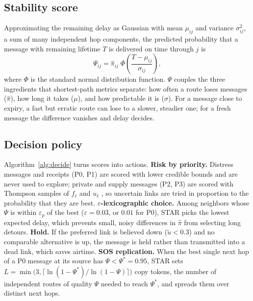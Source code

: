 \documentclass[jou,a4paper,11pt,floatsintext]{apa7}
\begin{document}
\subsection{Stability score}

Approximating the remaining delay as Gaussian with mean $\mu_{ij}$ and variance $\sigma^2_{ij}$, a sum of many independent hop components, the predicted probability that a message with remaining lifetime $T$ is delivered on time through $j$ is
\begin{equation}
\Psi_{ij}=\hat\pi_{ij}\;\Phi\!\left(\frac{T-\mu_{ij}}{\sigma_{ij}}\right),
\label{eq:psi}
\end{equation}
where $\Phi$ is the standard normal distribution function. $\Psi$ couples the three ingredients that shortest-path metrics separate: how often a route loses messages ($\hat\pi$), how long it takes ($\mu$), and how predictable it is ($\sigma$). For a message close to expiry, a fast but erratic route can lose to a slower, steadier one; for a fresh message the difference vanishes and delay decides.

\subsection{Decision policy}



Algorithm~\ref{alg:decide} turns scores into actions. \textbf{Risk by priority.} Distress messages and receipts (P0, P1) are scored with lower credible bounds and are never used to explore; private and supply messages (P2, P3) are scored with Thompson samples of $f_\ell$ and $u_\ell$ \parencite{russo2018}, so uncertain links are tried in proportion to the probability that they are best. \textbf{$\varepsilon$-lexicographic choice.} Among neighbors whose $\Psi$ is within $\varepsilon_p$ of the best ($\varepsilon=0.03$, or $0.01$ for P0), STAR picks the lowest expected delay, which prevents small, noisy differences in $\hat\pi$ from selecting long detours. \textbf{Hold.} If the preferred link is believed down ($\tilde u<0.3$) and no comparable alternative is up, the message is held rather than transmitted into a dead link, which saves airtime. \textbf{SOS replication.} When the best single next hop of a P0 message at its source has $\Psi<\Psi^\ast=0.95$, STAR sets $L=\min\big(3,\lceil\ln(1-\Psi^\ast)/\ln(1-\Psi)\rceil\big)$ copy tokens, the number of independent routes of quality $\Psi$ needed to reach $\Psi^\ast$, and spreads them over distinct next hops.
\end{document}
